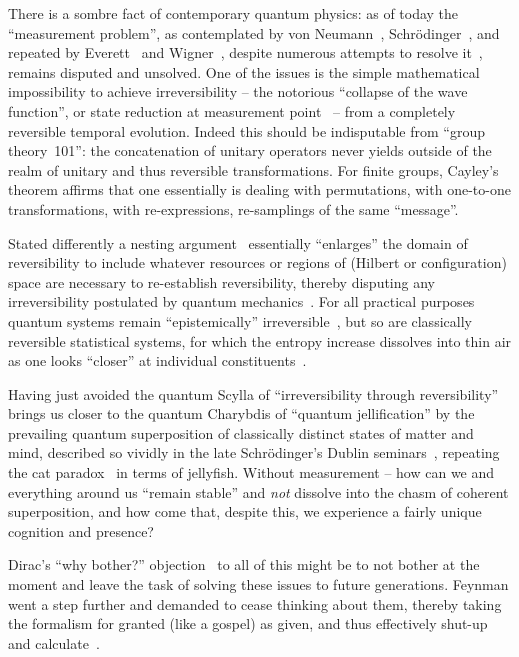 \documentclass{ws-procs9x6}
\begin{document}
There is a sombre fact of contemporary quantum physics:
as of today the ``measurement problem'', as contemplated by von Neumann~\cite{v-neumann-49},
Schr\"odinger~\cite{schrodinger,schroedinger-interpretation},
and repeated by Everett~\cite{everett,everett-1956} and Wigner~\cite{wigner:mb},
despite numerous attempts to resolve it~\cite{london-Bauer-1983},
remains disputed and unsolved.
One of the issues is the simple mathematical impossibility to achieve irreversibility
-- the notorious ``collapse of the wave function'', or state reduction at measurement point~\cite{mermin-07} --
from a completely reversible temporal evolution.
Indeed this should be indisputable from ``group theory~101'': the concatenation of unitary operators never yields outside of the realm of unitary and thus reversible transformations.
For finite groups, Cayley's theorem affirms %
that one essentially is dealing with permutations,
with one-to-one transformations, with re-expressions, re-samplings of the same ``message''.

Stated differently a nesting argument~\cite{v-neumann-49,everett,everett-1956,wigner:mb} essentially ``enlarges'' the domain of reversibility to
include whatever resources or regions of (Hilbert or configuration) space are necessary to re-establish reversibility,
thereby disputing any irreversibility postulated
by quantum mechanics~\cite{PhysRevD.22.879,PhysRevA.25.2208,greenberger2,Nature351,Zajonc-91,PhysRevA.45.7729,PhysRevLett.73.1223,PhysRevLett.75.3783,hkwz}.
For all practical purposes~\cite{bell-a} quantum systems remain ``epistemically'' irreversible~\cite{engrt-sg-I,engrt-sg-II},
but so are classically reversible statistical systems, for which the entropy increase dissolves into thin air
as one looks ``closer'' at individual constituents~\cite{Myrvold2011237}.

Having just avoided the quantum Scylla of ``irreversibility through reversibility''
brings us closer to the quantum Charybdis of ``quantum jellification''
by the prevailing quantum superposition of classically distinct states of matter and mind,
described so vividly in the late Schr\"odinger's Dublin seminars~\cite{schroedinger-interpretation}, repeating the cat paradox~\cite{schrodinger}
in terms of jellyfish.
Without measurement -- how can we and everything around us ``remain stable'' and \emph{not} dissolve into the chasm of coherent superposition,
and how come that, despite this, we experience a fairly unique cognition and presence?

Dirac's ``why bother?'' objection~\cite{bell-a} to all of this might be to not bother at the moment and
leave the task of solving these issues to future generations. Feynman went a step further
and demanded to cease thinking about them, thereby taking the formalism for granted (like a gospel) as given,
and thus effectively shut-up and calculate~\cite{feynman-law,mermin-1989-shutup,mermin-2004-shutup}.
\end{document}
